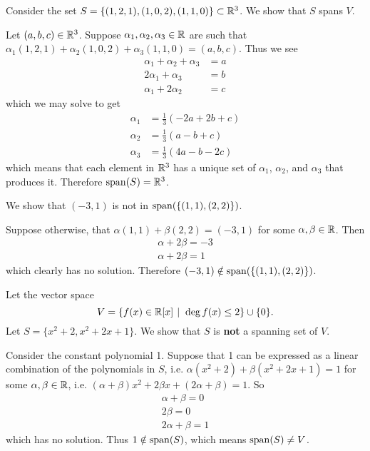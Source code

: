 \begin{example}
    Consider the set $S = \{(1, 2, 1), (1, 0, 2), (1, 1, 0)\} \subset \mathbb{R}^3$. We show that $S$ spans $V$.

    Let $(a, b, c) \in \mathbb{R}^3$. Suppose $\alpha_1, \alpha_2, \alpha_3 \in \mathbb{R}$ are such that $\alpha_1(1, 2, 1) + \alpha_2(1, 0, 2) + \alpha_3(1, 1, 0) = (a, b, c)$. Thus we see
    \begin{align*}
        \alpha_1 + \alpha_2 + \alpha_3 &= a\\
        2\alpha_1 + \alpha_3 &= b\\
        \alpha_1 + 2\alpha_2 &= c
    \end{align*}
    which we may solve to get
    \begin{align*}
        \alpha_1 &= \frac13(-2a + 2b + c)\\
        \alpha_2 &= \frac13(a - b + c)\\
        \alpha_3 &= \frac13(4a - b - 2c)
    \end{align*}
    which means that each element in $\mathbb{R}^3$ has a unique set of $\alpha_1$, $\alpha_2$, and $\alpha_3$ that produces it. Therefore $\mathrm{span}(S) = \mathbb{R}^3$.
\end{example}

\begin{example}
    We show that $(-3, 1)$ is not in $\mathrm{span}(\{(1,1), (2,2)\})$.

    Suppose otherwise, that $\alpha(1,1) + \beta(2,2) = (-3,1)$ for some $\alpha, \beta \in \mathbb{R}$. Then
    \begin{align*}
        \alpha + 2\beta = -3\\
        \alpha + 2\beta = 1
    \end{align*}
    which clearly has no solution. Therefore $(-3, 1) \notin \mathrm{span}(\{(1, 1), (2, 2)\})$.
\end{example}

\begin{example}
    Let the vector space
    \[
        V = \{f(x) \in \R[x] \vert \deg f(x) \leq 2\} \cup \{0\}.
    \]
    Let $S = \{x^2 + 2, x^2 + 2x + 1\}$. We show that $S$ is \textbf{not} a spanning set of $V$.

    Consider the constant polynomial 1. Suppose that 1 can be expressed as a linear combination of the polynomials in $S$, i.e. $\alpha(x^2 + 2) + \beta(x^2+2x+1) = 1$ for some $\alpha, \beta \in \mathbb{R}$, i.e. $(\alpha + \beta)x^2 + 2\beta x + (2\alpha + \beta) = 1$. So
    \begin{align*}
        \alpha + \beta = 0\\
        2\beta = 0\\
        2\alpha + \beta = 1
    \end{align*}
    which has no solution. Thus $1 \notin \mathrm{span}(S)$, which means $\mathrm{span}(S) \neq V$.
\end{example}

